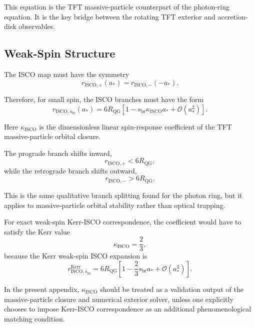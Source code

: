 This equation is the TFT massive-particle counterpart of the photon-ring equation. It is the key bridge between the rotating TFT exterior and accretion-disk observables.

\subsection{Weak-Spin Structure}

The ISCO map must have the symmetry
\begin{equation}
    r_{\mathrm{ISCO},+}(a_\ast) = r_{\mathrm{ISCO},-}(-a_\ast).
\end{equation}

Therefore, for small spin, the ISCO branches must have the form
\begin{equation}
    r_{\mathrm{ISCO},s_{\mathrm{br}}}(a_\ast) = 6R_{\mathrm{QG}} \left[ 1 - s_{\mathrm{br}}\kappa_{\mathrm{ISCO}}a_\ast + \mathcal{O}(a_\ast^2) \right].
\end{equation}

Here $\kappa_{\mathrm{ISCO}}$ is the dimensionless linear spin-response coefficient of the TFT massive-particle orbital closure.

The prograde branch shifts inward,
\begin{equation}
    r_{\mathrm{ISCO},+} < 6R_{\mathrm{QG}},
\end{equation}
while the retrograde branch shifts outward,
\begin{equation}
    r_{\mathrm{ISCO},-} > 6R_{\mathrm{QG}}.
\end{equation}

This is the same qualitative branch splitting found for the photon ring, but it applies to massive-particle orbital stability rather than optical trapping.

For exact weak-spin Kerr-ISCO correspondence, the coefficient would have to satisfy the Kerr value
\begin{equation}
    \kappa_{\mathrm{ISCO}} = \frac{2}{3},
\end{equation}
because the Kerr weak-spin ISCO expansion is
\begin{equation}
    r_{\mathrm{ISCO},s_{\mathrm{br}}}^{\mathrm{Kerr}} = 6R_{\mathrm{QG}} \left[ 1 - \frac{2}{3}s_{\mathrm{br}} a_\ast + \mathcal{O}(a_\ast^2) \right].
\end{equation}

In the present appendix, $\kappa_{\mathrm{ISCO}}$ should be treated as a validation output of the massive-particle closure and numerical exterior solver, unless one explicitly chooses to impose Kerr-ISCO correspondence as an additional phenomenological matching condition.

